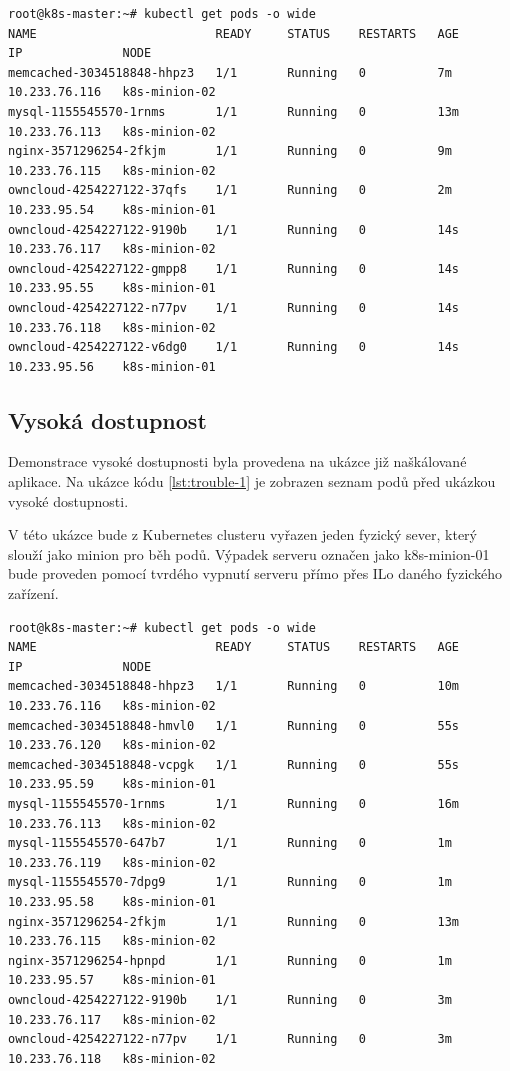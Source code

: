 {{\begin{lstlisting}[caption={Ukázka škálování, čast 4},label= {lst:scale-4}]
root@k8s-master:~# kubectl get pods -o wide
NAME                         READY     STATUS    RESTARTS   AGE       IP              NODE
memcached-3034518848-hhpz3   1/1       Running   0          7m        10.233.76.116   k8s-minion-02
mysql-1155545570-1rnms       1/1       Running   0          13m       10.233.76.113   k8s-minion-02
nginx-3571296254-2fkjm       1/1       Running   0          9m        10.233.76.115   k8s-minion-02
owncloud-4254227122-37qfs    1/1       Running   0          2m        10.233.95.54    k8s-minion-01
owncloud-4254227122-9190b    1/1       Running   0          14s       10.233.76.117   k8s-minion-02
owncloud-4254227122-gmpp8    1/1       Running   0          14s       10.233.95.55    k8s-minion-01
owncloud-4254227122-n77pv    1/1       Running   0          14s       10.233.76.118   k8s-minion-02
owncloud-4254227122-v6dg0    1/1       Running   0          14s       10.233.95.56    k8s-minion-01
\end{lstlisting}

\subsection{Vysoká dostupnost}
Demonstrace vysoké dostupnosti byla provedena na ukázce již naškálované aplikace. Na ukázce kódu \ref{lst:trouble-1} je zobrazen seznam podů před ukázkou vysoké dostupnosti. 

V této ukázce bude z Kubernetes clusteru vyřazen jeden fyzický sever, který slouží jako minion pro běh podů. Výpadek serveru označen jako k8s-minion-01 bude proveden pomocí tvrdého vypnutí serveru přímo přes ILo daného fyzického zařízení.

\begin{lstlisting}[caption={Seznam podů po nainstalovaní Kuberentes},label= {lst:trouble-1}]
root@k8s-master:~# kubectl get pods -o wide
NAME                         READY     STATUS    RESTARTS   AGE       IP              NODE
memcached-3034518848-hhpz3   1/1       Running   0          10m       10.233.76.116   k8s-minion-02
memcached-3034518848-hmvl0   1/1       Running   0          55s       10.233.76.120   k8s-minion-02
memcached-3034518848-vcpgk   1/1       Running   0          55s       10.233.95.59    k8s-minion-01
mysql-1155545570-1rnms       1/1       Running   0          16m       10.233.76.113   k8s-minion-02
mysql-1155545570-647b7       1/1       Running   0          1m        10.233.76.119   k8s-minion-02
mysql-1155545570-7dpg9       1/1       Running   0          1m        10.233.95.58    k8s-minion-01
nginx-3571296254-2fkjm       1/1       Running   0          13m       10.233.76.115   k8s-minion-02
nginx-3571296254-hpnpd       1/1       Running   0          1m        10.233.95.57    k8s-minion-01
owncloud-4254227122-9190b    1/1       Running   0          3m        10.233.76.117   k8s-minion-02
owncloud-4254227122-n77pv    1/1       Running   0          3m        10.233.76.118   k8s-minion-02
\end{lstlisting}

}}

